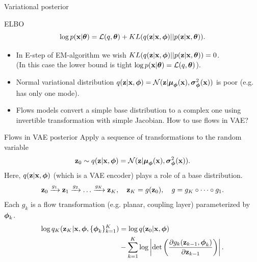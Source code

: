 

\begin{frame}
\titlepage
\end{frame}

\begin{frame}{Variational posterior}
\begin{block}{ELBO}
	\[
	\log p(\mathbf{x} | \boldsymbol{\theta}) = \mathcal{L}(q, \boldsymbol{\theta}) + KL(q(\mathbf{z} | \mathbf{x}, \boldsymbol{\phi}) || p(\mathbf{z} | \mathbf{x}, \boldsymbol{\theta})).
	\]
\end{block}
\begin{itemize}
	\item In E-step of EM-algorithm we wish $KL(q(\mathbf{z} | \mathbf{x}, \boldsymbol{\phi}) || p(\mathbf{z} | \mathbf{x}, \boldsymbol{\theta})) = 0$. \\
	(In this case the lower bound is tight $\log p(\mathbf{x} | \boldsymbol{\theta}) = \mathcal{L}(q, \boldsymbol{\theta})$). \\
	\item Normal variational distribution $q(\mathbf{z} | \mathbf{x}, \boldsymbol{\phi}) = \mathcal{N}(\mathbf{z}| \boldsymbol{\mu}_{\boldsymbol{\phi}}(\mathbf{x}), \boldsymbol{\sigma}^2_{\boldsymbol{\phi}}(\mathbf{x}))$ is poor (e.g. has only one mode). \\
	\item Flows models convert a simple base distribution to a complex one using invertible transformation with simple Jacobian. How to use flows in VAE?
\end{itemize}
\end{frame}
\begin{frame}{Flows in VAE posterior}
Apply a sequence of transformations to the random variable
\[
\mathbf{z}_0 \sim q(\mathbf{z} | \mathbf{x}, \boldsymbol{\phi}) = \mathcal{N}(\mathbf{z}| \boldsymbol{\mu}_{\boldsymbol{\phi}}(\mathbf{x}), \boldsymbol{\sigma}^2_{\boldsymbol{\phi}}(\mathbf{x})).
\]
Here, $q(\mathbf{z} | \mathbf{x}, \boldsymbol{\phi})$ (which is a VAE encoder) plays a role of a base distribution.
\[
\mathbf{z}_0 \xrightarrow{g_1} \mathbf{z}_1 \xrightarrow{g_2} \dots \xrightarrow{g_K} \mathbf{z}_K, \quad \mathbf{z}_K = g(\mathbf{z}_0), \quad g = g_K \circ \dots \circ g_1.
\]
Each $g_k $ is a flow transformation (e.g. planar, coupling layer) parameterized by $\boldsymbol{\phi}_k$.
\begin{align*}
	\log q_K(\mathbf{z}_K | \mathbf{x}, \boldsymbol{\phi}, \{\boldsymbol{\phi}_k\}_{k=1}^K) &= \log q(\mathbf{z}_0 | \mathbf{x}, \boldsymbol{\phi}) \\ &- \sum_{k=1}^K \log \left| \det \left( \frac{\partial g_k(\mathbf{z}_{k - 1}, \boldsymbol{\phi}_k)}{\partial \mathbf{z}_{k-1}} \right) \right|.
\end{align*}

\end{frame}
